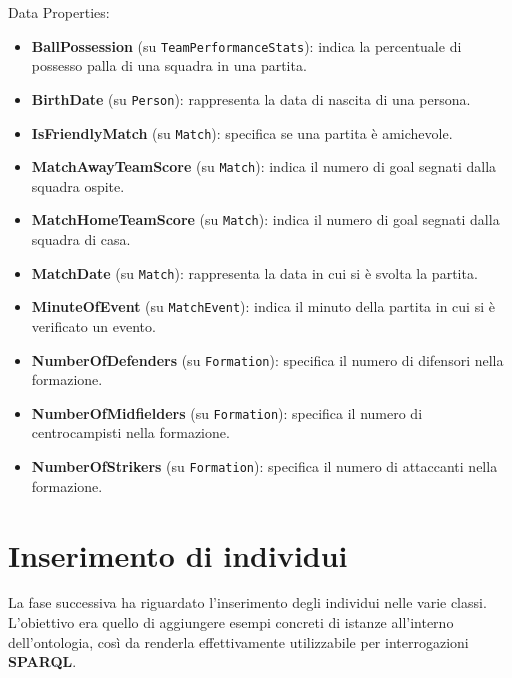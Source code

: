\documentclass[11pt]{report} %
\begin{document}
\begin{itemize}[leftmargin=*]
\begin{itemize}
\end{itemize}
\newpage
Data Properties:
\begin{itemize}
    \item \textbf{BallPossession} (su \texttt{TeamPerformanceStats}): indica la percentuale di possesso palla di una squadra in una partita.
    \item \textbf{BirthDate} (su \texttt{Person}): rappresenta la data di nascita di una persona.

\item \textbf{IsFriendlyMatch} (su \texttt{Match}): specifica se una partita è amichevole.

\item \textbf{MatchAwayTeamScore} (su \texttt{Match}): indica il numero di goal segnati dalla squadra ospite.

\item \textbf{MatchHomeTeamScore} (su \texttt{Match}): indica il numero di goal segnati dalla squadra di casa.

\item \textbf{MatchDate} (su \texttt{Match}): rappresenta la data in cui si è svolta la partita.

\item \textbf{MinuteOfEvent} (su \texttt{MatchEvent}): indica il minuto della partita in cui si è verificato un evento.

\item \textbf{NumberOfDefenders} (su \texttt{Formation}): specifica il numero di difensori nella formazione.

\item \textbf{NumberOfMidfielders} (su \texttt{Formation}): specifica il numero di centrocampisti nella formazione.

\item \textbf{NumberOfStrikers} (su \texttt{Formation}): specifica il numero di attaccanti nella formazione.

\end{itemize}
\chapter{Inserimento di individui}
La fase successiva ha riguardato l'inserimento degli individui nelle varie classi. L'obiettivo era quello di aggiungere esempi concreti di istanze all'interno dell'ontologia, così da renderla effettivamente utilizzabile per interrogazioni \textbf{SPARQL}.

\hfill


\end{itemize}
\end{document}
